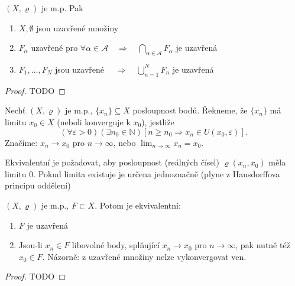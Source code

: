 \renewcommand{\theveta}{\arabic{section}.$\arabic{veta}^\prime$}
\setcounter{veta}{0}
\begin{veta}
  $(X,\varrho)$ je m.p. Pak
  \begin{enumerate}[1.]
    \item $X, \emptyset$ jsou uzavřené množiny
    \item $F_{\alpha}$ uzavřené pro $\forall \alpha \in \mathcal{A} \quad \Longrightarrow \quad \bigcap_{\alpha \in \mathcal{A}} F_{\alpha}$ je uzavřená
    \item $F_{1}, \ldots, F_{N}$ jsou uzavřené $\quad \Longrightarrow \quad \bigcup_{n=1}^{N} F_{n}$ je uzavřená
  \end{enumerate}
\end{veta}
\renewcommand{\theveta}{\arabic{section}.\arabic{veta}}

\begin{proof}
  TODO
\end{proof}

\begin{definice}
  Nechť $(X,\varrho)$ je m.p., $\{x_{n}\} \subseteq X$ posloupnost bodů. Řekneme, že $\{x_{n}\}$ má limitu $x_0 \in X$ (neboli konverguje k $x_0$), jestliže
  \[
  \left(\forall \varepsilon > 0\right) \left(\exists n_{0} \in \mathbb N\right) \left[ n \geq n_{0} \Rightarrow x_{n} \in U(x_{0}, \varepsilon) \right].
  \]
  Značíme: $x_{n} \to x_{0}$ pro $n \to \infty$, nebo $\lim_{n \to \infty} x_{n} = x_{0}$.

  Ekvivalentní je požadovat, aby posloupnost (reálných čísel) $\varrho(x_{n}, x_{0})$ měla limitu 0. Pokud limita existuje je určena jednoznačně (plyne z Hausdorffova principu oddělení)
\end{definice}

\begin{veta}
  $(X,\varrho)$ je m.p., $F \subset X$. Potom je ekvivalentní:
  \begin{enumerate}[1.]
    \item $F$ je uzavřená
    \item Jsou-li $x_{n} \in F$ libovolné body, splňující $x_{n} \to x_{0}$ pro $n \to \infty$, pak nutně též $x_{0} \in F$. Názorně: z uzavřené množiny nelze vykonvergovat ven.
  \end{enumerate}
\end{veta}

\begin{proof}
  TODO
\end{proof}

